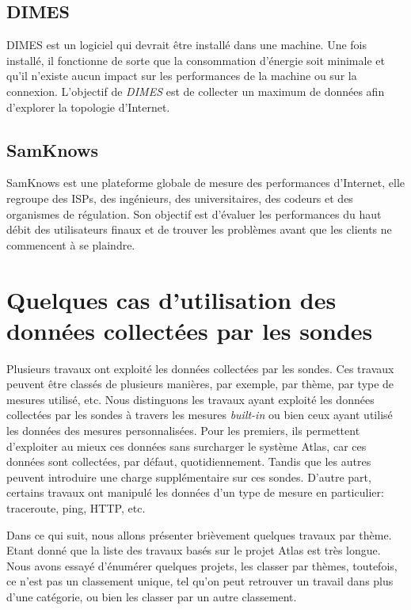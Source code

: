 \subsection{DIMES}
DIMES \cite{Shavitt:2005:DLI:1096536.1096546} est un logiciel qui devrait être installé dans une machine. Une fois installé, il fonctionne de sorte que la consommation d'énergie soit minimale et qu'il n'existe aucun impact sur les performances de la machine ou sur la connexion. L'objectif de \textit{DIMES} est de collecter un maximum de données afin d'explorer la topologie d'Internet.


\subsection{SamKnows}
SamKnows \cite{SamKnows}  est une plateforme globale de mesure des performances d'Internet, elle regroupe des ISPs, des ingénieurs, des universitaires, des codeurs et des organismes de régulation. Son objectif est d'évaluer les performances du haut débit des utilisateurs finaux et de trouver les problèmes avant que les clients ne commencent à se plaindre. 

\section{Quelques cas d'utilisation des données collectées par les sondes} \label{use-cases-atlas}
Plusieurs travaux ont exploité les données collectées par les sondes. Ces travaux peuvent être classés de plusieurs manières, par exemple,  par thème,  par  type de mesures utilisé, etc. Nous distinguons les travaux ayant exploité les données collectées par les sondes  à travers les mesures \textit{built-in} ou bien ceux ayant utilisé les données des mesures personnalisées.  Pour les premiers, ils permettent d'exploiter au mieux ces données sans surcharger le système Atlas, car ces données sont collectées, par défaut, quotidiennement. Tandis que les autres peuvent introduire une charge supplémentaire sur ces sondes. D'autre part, certains travaux  ont manipulé  les données d'un  type de mesure en particulier: traceroute, ping,  HTTP, etc. 

Dans ce qui suit, nous allons présenter brièvement quelques travaux par thème. Etant donné que 
la liste des travaux basés sur le projet  Atlas est très longue. Nous avons essayé d'énumérer quelques projets, les classer par thèmes, toutefois, ce n'est pas un classement unique, tel qu'on peut retrouver un travail dans plus d'une catégorie, ou bien les classer par un autre classement. 


